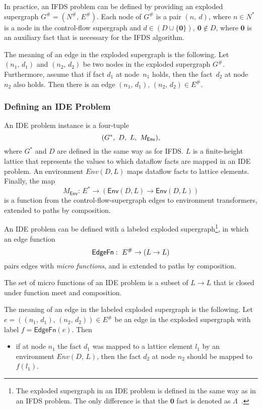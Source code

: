 In practice, an IFDS problem can be defined by providing an exploded supergraph
$G^\#=(N^\#,\,E^\#)$. Each node of $G^\#$ is a pair $(n,\ d)$, where $n\in N^*$ is a node in the control-flow supergraph and $d\in (D\cup\{\mathbf{0}\}),\ \mathbf0\notin D$, where $\mathbf0$ is an auxiliary fact that is necessary for the IFDS algorithm.

The meaning of an edge in the exploded supergraph is the following.
Let $(n_1,\,d_1)$ and $(n_2,\,d_2)$ be two nodes in the exploded supergraph $G^\#$. Furthermore, assume that if fact $d_1$ at node~$n_1$ holds, then the fact~$d_2$ at node~$n_2$ also holds. Then there is an edge $(n_1,\,d_1),\,(n_2,\,d_2)\in E^\#$.

\subsubsection{Defining an IDE Problem}\label{sec:defide}
An IDE problem instance is a four-tuple
\[
    (G^*,\ D,\ L,\ M_\textsf{Env}),
\]
where $G^*$ and $D$ are defined in the same way as for IFDS. $L$ is a finite-height lattice that represents the values to which dataflow facts are mapped in an IDE problem. An environment $Env(D, L)$ maps dataflow facts to lattice elements. Finally, the map $$M_{\textsf{Env}}:\,E^*\to(\textsf{Env}(D, L)\to \textsf{Env}(D, L))$$ is a function from the control-flow-supergraph edges to environment transformers, extended to paths by composition.

An IDE problem can be defined with a labeled exploded supergraph\footnote{
    The exploded supergraph in an IDE problem is defined in the same way as in an IFDS problem. The only difference is that the $\mathbf0$ fact is denoted as $\Lambda$~\cite{reps1995precise,sagiv1996precise}.
}, in which an edge function
\begin{equation}
  \textsf{EdgeFn}:\ E^\#\to(L\to L)
\end{equation}
pairs edges with \textit{micro functions}, and is extended to paths by composition.

The set of micro functions of an IDE problem is a subset of $L\to L$ that is closed under function meet and composition.

The meaning of an edge in the labeled exploded supergraph is the following. Let $e=((n_1,\,d_1),\,(n_2,\,d_2))\in E^\#$ be an edge in the exploded supergraph with label $f=\mathsf{EdgeFn}(e)$. Then
\begin{itemize}
  \item if at node $n_1$ the fact $d_1$ was mapped to a lattice element $l_1$ by an environment $Env(D,\,L)$, then the fact $d_2$ at node $n_2$ should be mapped to $f(l_1)$.
\end{itemize}

